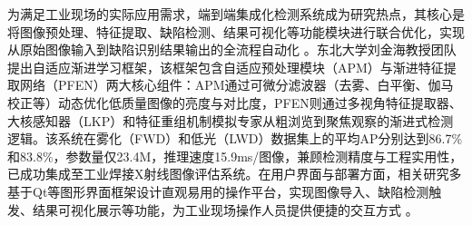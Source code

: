 \documentclass{cjlu_literature_review}
\begin{document}
	为满足工业现场的实际应用需求，端到端集成化检测系统成为研究热点，其核心是将图像预处理、特征提取、缺陷检测、结果可视化等功能模块进行联合优化，实现从原始图像输入到缺陷识别结果输出的全流程自动化 \cite{Zuo2025_EndToEndWeldingDefect, Chen2018_EncoderDecoderSegmentation}。东北大学刘金海教授团队 \cite{Zuo2025_EndToEndWeldingDefect, Guo2021_ContrastEnhancementGAN} 提出自适应渐进学习框架，该框架包含自适应预处理模块（APM）与渐进特征提取网络（PFEN）两大核心组件：APM通过可微分滤波器（去雾、白平衡、伽马校正等）动态优化低质量图像的亮度与对比度，PFEN则通过多视角特征提取器、大核感知器（LKP）和特征重组机制模拟专家从粗浏览到聚焦观察的渐进式检测逻辑。该系统在雾化（FWD）和低光（LWD）数据集上的平均AP分别达到86.7\%和83.8\%，参数量仅23.4M，推理速度15.9ms/图像，兼顾检测精度与工程实用性，已成功集成至工业焊接X射线图像评估系统。在用户界面与部署方面，相关研究多基于Qt等图形界面框架设计直观易用的操作平台，实现图像导入、缺陷检测触发、结果可视化展示等功能，为工业现场操作人员提供便捷的交互方式 \cite{Hu2020_DeepLearningWeldDefect, Ajmi2023_FasterRCNNWeldDefects}。
	
	\printbibliography
	
\end{document}
